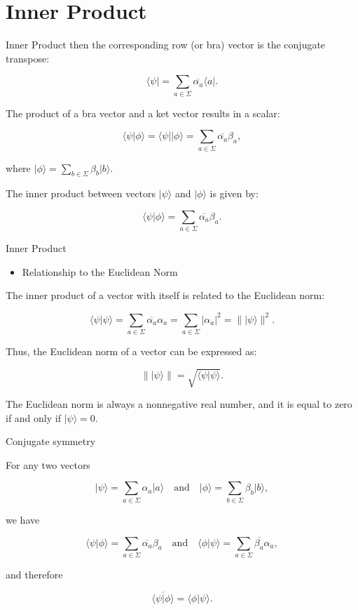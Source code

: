 \documentclass[12pt, aspectratio=169]{beamer}
\begin{document}
\section{Inner Product}
\begin{frame}{Inner Product}
then the corresponding row (or bra) vector is the conjugate transpose:

\[
\langle \psi \vert = \sum_{a\in\Sigma} \overline{\alpha_a} \langle a \vert. \tag{2}
\]

The product of a bra vector and a ket vector results in a scalar:

\[
\langle \psi \vert \phi \rangle = \langle \psi \vert \vert \phi \rangle = \sum_{a\in\Sigma} \overline{\alpha_a} \beta_a,
\]

where \(\vert \phi \rangle = \sum_{b\in\Sigma} \beta_b \vert b \rangle\).

The inner product between vectors \(\vert \psi \rangle\) and \(\vert \phi \rangle\) is given by:

\[
\langle \psi \vert \phi \rangle = \sum_{a\in\Sigma} \overline{\alpha_a} \beta_a.
\]

\end{frame}
\begin{frame}{Inner Product}
\begin{itemize}
\item{Relationship to the Euclidean Norm}
\end{itemize}
The inner product of a vector with itself is related to the Euclidean norm:

\[
\langle \psi \vert \psi \rangle = \sum_{a\in\Sigma} \overline{\alpha_a} \alpha_a = \sum_{a\in\Sigma} \vert \alpha_a \vert^2 = \bigl\| \vert \psi \rangle \bigr\|^2.
\]

Thus, the Euclidean norm of a vector can be expressed as:

\[
\bigl\| \vert \psi \rangle \bigr\| = \sqrt{\langle \psi \vert \psi \rangle}.
\]

The Euclidean norm is always a nonnegative real number, and it is equal to zero if and only if \(\vert \psi \rangle = 0\).
\end{frame}
\begin{frame}{Conjugate symmetry}

For any two vectors

\[
\vert \psi \rangle = \sum_{a\in\Sigma} \alpha_a \vert a \rangle \quad\text{and}\quad \vert \phi \rangle = \sum_{b\in\Sigma} \beta_b \vert b \rangle,
\]

we have

\[
\langle \psi \vert \phi \rangle = \sum_{a\in\Sigma} \overline{\alpha_a} \beta_a \quad\text{and}\quad \langle \phi \vert \psi \rangle = \sum_{a\in\Sigma} \overline{\beta_a} \alpha_a,
\]

and therefore

\[
\overline{\langle \psi \vert \phi \rangle} = \langle \phi \vert \psi \rangle.
\]
\end{frame}
\end{document}
